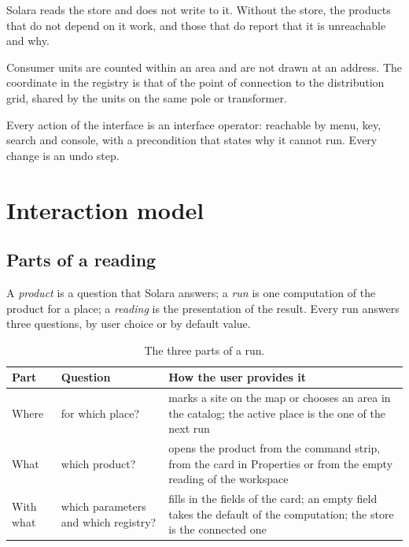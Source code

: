 \documentclass[10pt,a4paper,oneside]{article}
\begin{document}
\begin{description}[leftmargin=2.4em,labelwidth=2em,font=\bfseries]
  \item[R8] Solara reads the store and does not write to it. Without the
    store, the products that do not depend on it work, and those that do
    report that it is unreachable and why.
  \item[R9] Consumer units are counted within an area and are not drawn at
    an address. The coordinate in the registry is that of the point of
    connection to the distribution grid, shared by the units on the same
    pole or transformer.
  \item[R10] Every action of the interface is an interface operator:
    reachable by menu, key, search and console, with a precondition that
    states why it cannot run. Every change is an undo step.
\end{description}

\section{Interaction model}

\subsection{Parts of a reading}

A \emph{product} is a question that Solara answers; a \emph{run} is one
computation of the product for a place; a \emph{reading} is the presentation
of the result. Every run answers three questions, by user choice or by
default value.

\begin{table}[H]
\caption{The three parts of a run.}
\begin{tabularx}{\linewidth}{l l Y}
\toprule
\textbf{Part} & \textbf{Question} & \textbf{How the user provides it} \\
\midrule
Where & for which place? & marks a site on the map or chooses an area in the
  catalog; the active place is the one of the next run \\
What & which product? & opens the product from the command strip, from the
  card in Properties or from the empty reading of the workspace \\
With what & which parameters and which registry? & fills in the fields of the
  card; an empty field takes the default of the computation; the store is the
  connected one \\
\bottomrule
\end{tabularx}
\end{table}
\end{document}
